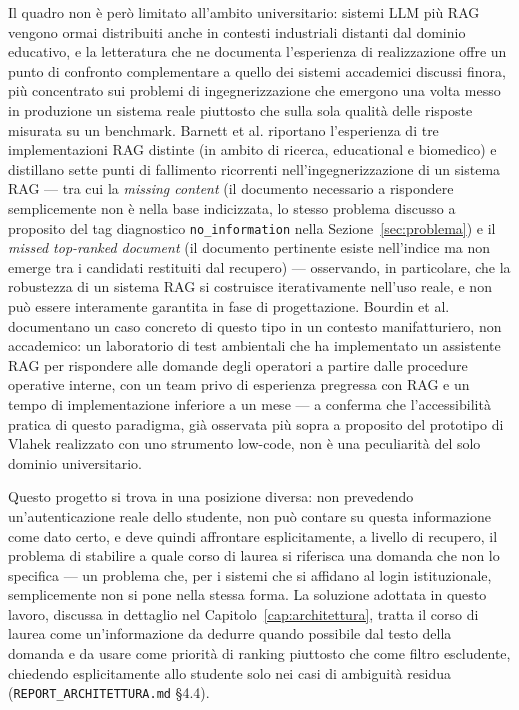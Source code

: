 Il quadro non è però limitato all'ambito universitario: sistemi LLM più RAG vengono ormai distribuiti anche in
contesti industriali distanti dal dominio educativo, e la letteratura che ne documenta l'esperienza di
realizzazione offre un punto di confronto complementare a quello dei sistemi accademici discussi finora, più
concentrato sui problemi di ingegnerizzazione che emergono una volta messo in produzione un sistema reale piuttosto
che sulla sola qualità delle risposte misurata su un benchmark. Barnett et al. \cite{barnett2024sevenfailures}
riportano l'esperienza di tre implementazioni RAG distinte (in ambito di ricerca, educational e biomedico) e
distillano sette punti di fallimento ricorrenti nell'ingegnerizzazione di un sistema RAG --- tra cui la
\emph{missing content} (il documento necessario a rispondere semplicemente non è nella base indicizzata, lo stesso
problema discusso a proposito del tag diagnostico \texttt{no\_information} nella Sezione~\ref{sec:problema}) e il
\emph{missed top-ranked document} (il documento pertinente esiste nell'indice ma non emerge tra i candidati restituiti
dal recupero) --- osservando, in particolare, che la robustezza di un sistema RAG si costruisce iterativamente
nell'uso reale, e non può essere interamente garantita in fase di progettazione. Bourdin et al.
\cite{bourdin2025easirag} documentano un caso concreto di questo tipo in un contesto manifatturiero, non
accademico: un laboratorio di test ambientali che ha implementato un assistente RAG per rispondere alle domande
degli operatori a partire dalle procedure operative interne, con un team privo di esperienza pregressa con RAG e un
tempo di implementazione inferiore a un mese --- a conferma che l'accessibilità pratica di questo paradigma, già
osservata più sopra a proposito del prototipo di Vlahek realizzato con uno strumento low-code, non è una
peculiarità del solo dominio universitario.

Questo progetto si trova in una posizione diversa: non prevedendo un'autenticazione reale dello studente, non può
contare su questa informazione come dato certo, e deve quindi affrontare esplicitamente, a livello di recupero, il
problema di stabilire a quale corso di laurea si riferisca una domanda che non lo specifica --- un problema che, per
i sistemi che si affidano al login istituzionale, semplicemente non si pone nella stessa forma. La soluzione adottata
in questo lavoro, discussa in dettaglio nel Capitolo~\ref{cap:architettura}, tratta il corso di laurea come
un'informazione da dedurre quando possibile dal testo della domanda e da usare come priorità di ranking piuttosto
che come filtro escludente, chiedendo esplicitamente allo studente solo nei casi di ambiguità residua
(\texttt{REPORT\_ARCHITETTURA.md} \S4.4).


